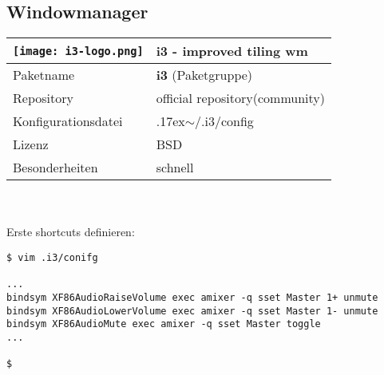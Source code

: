 \subsection{Windowmanager}
\begin{tabular}{l|l}
\texttt{[image: i3-logo.png]} & i3 - improved tiling wm \\ \hline
Paketname & \textbf{i3} (Paketgruppe) \\ 
Repository & official repository(community) \\
Konfigurationsdatei & {{\raise.17ex\hbox{$\scriptstyle\mathtt{\sim}$}}/.i3/config} \\
Lizenz & BSD \\
Besonderheiten & schnell \\
\end{tabular}
\\ \\
Erste shortcuts definieren:

\begin{lstlisting}[style=Bash]
$ vim .i3/conifg

...
bindsym XF86AudioRaiseVolume exec amixer -q sset Master 1+ unmute
bindsym XF86AudioLowerVolume exec amixer -q sset Master 1- unmute
bindsym XF86AudioMute exec amixer -q sset Master toggle
...

$
\end{lstlisting}
